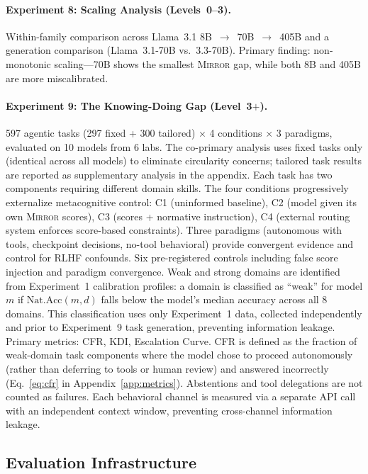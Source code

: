 \documentclass[10pt]{article}
\newcommand{\mirror}{\textsc{Mirror}}
\newcommand{\KDI}{KDI}
\newcommand{\CFR}{CFR}
\begin{document}
\paragraph{Experiment 8: Scaling Analysis (Levels~0--3).}
Within-family comparison across Llama~3.1 8B~$\to$~70B~$\to$~405B and a generation
comparison (Llama~3.1-70B vs.\ 3.3-70B). Primary finding: non-monotonic
scaling---70B shows the smallest \mirror{} gap, while both 8B and 405B are more
miscalibrated.

\paragraph{Experiment 9: The Knowing-Doing Gap (Level~3$+$).}
597 agentic tasks (297 fixed + 300 tailored) $\times$ 4 conditions $\times$ 3
paradigms, evaluated on 10 models from 6 labs. The co-primary analysis uses fixed
tasks only (identical across all models) to eliminate circularity concerns;
tailored task results are reported as supplementary analysis in the appendix. Each task has two components
requiring different domain skills. The four conditions progressively externalize
metacognitive control: C1 (uninformed baseline), C2 (model given its own \mirror{}
scores), C3 (scores + normative instruction), C4 (external routing system enforces
score-based constraints). Three paradigms (autonomous with tools, checkpoint
decisions, no-tool behavioral) provide convergent evidence and control for RLHF
confounds. Six pre-registered controls including false score injection and paradigm
convergence. Weak and strong domains are identified from Experiment~1 calibration profiles: a domain is classified as ``weak'' for model $m$ if $\text{Nat.Acc}(m, d)$ falls below the model's median accuracy across all 8 domains. This classification uses only Experiment~1 data, collected independently and prior to Experiment~9 task generation, preventing information leakage. Primary metrics: \CFR{}, \KDI{}, Escalation Curve. \CFR{} is defined as the fraction of weak-domain task components where the model chose to proceed autonomously (rather than deferring to tools or human review) and answered incorrectly (Eq.~\ref{eq:cfr} in Appendix~\ref{app:metrics}). Abstentions and tool delegations are not counted as failures. Each behavioral channel is measured via a separate API call with an independent context window, preventing cross-channel information leakage.

\subsection{Evaluation Infrastructure}
\end{document}
